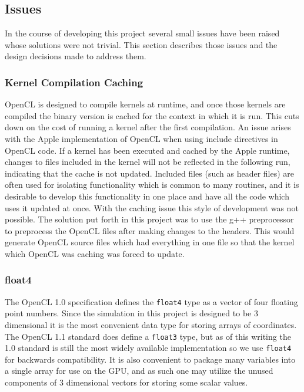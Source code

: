 \subsection{Issues}
In the course of developing this project several small issues have been raised
whose solutions were not trivial. This section describes those issues and the
design decisions made to address them.

\subsubsection{Kernel Compilation Caching}
OpenCL is designed to compile kernels at runtime, and once those kernels are
compiled the binary version is cached for the context in which it is run. This
cuts down on the cost of running a kernel after the first compilation. An issue
arises with the Apple implementation of OpenCL when using include directives in
OpenCL code. If a kernel has been executed and cached by the Apple runtime,
changes to files included in the kernel will not be reflected in the following
run, indicating that the cache is not updated. Included files (such as header
files) are often used for isolating functionality which is common to many
routines, and it is desirable to develop this functionality in one place and
have all the code which uses it updated at once. With the caching issue this
style of development was not possible. The solution put forth in this project
was to use the g++ preprocessor to preprocess the OpenCL files after making
changes to the headers. This would generate OpenCL source files which had
everything in one file so that the kernel which OpenCL was caching was forced
to update. 


\subsubsection{float4}
The OpenCL 1.0 specification defines the \verb|float4| type as a vector of four
floating point numbers. Since the simulation in this project is designed to be
3 dimensional it is the most convenient data type for storing arrays of
coordinates. The OpenCL 1.1 standard does define a \verb|float3| type, but as
of this writing the 1.0 standard is still the most widely available
implementation so we use \verb|float4| for backwards compatibility. It is also
convenient to package many variables into a single array for use on the GPU,
and as such one may utilize the unused components of 3 dimensional vectors for
storing some scalar values.

